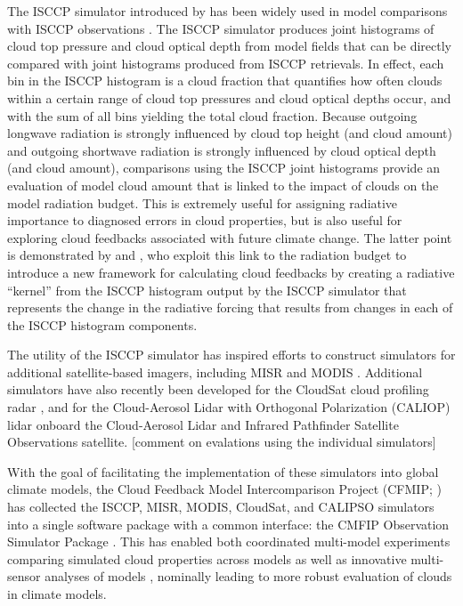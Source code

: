 The ISCCP simulator introduced by \citet{klein_and_jakob_1999} has been
widely used in model comparisons with ISCCP observations
\citep{webb_et_al_2001, norris_and_weaver_2001, lin_and_zhang_2004, zhang_et_al_2005, wyant_et_al_2006, klein_et_al_2013}.
The ISCCP simulator produces joint histograms of cloud top pressure and
cloud optical depth from model fields that can be directly compared with
joint histograms produced from ISCCP retrievals. In effect, each bin in
the ISCCP histogram is a cloud fraction that quantifies how often clouds
within a certain range of cloud top pressures and cloud optical depths
occur, and with the sum of all bins yielding the total cloud fraction.
Because outgoing longwave radiation is strongly influenced by cloud top
height (and cloud amount) and outgoing shortwave radiation is strongly
influenced by cloud optical depth (and cloud amount), comparisons using
the ISCCP joint histograms provide an evaluation of model cloud amount
that is linked to the impact of clouds on the model radiation budget.
This is extremely useful for assigning radiative importance to diagnosed
errors in cloud properties, but is also useful for exploring cloud
feedbacks associated with future climate change. The latter point is
demonstrated by \citet{zelinka_et_al_2012a} and
\citet{zelinka_et_al_2012b}, who exploit this link to the radiation
budget to introduce a new framework for calculating cloud feedbacks by
creating a radiative ``kernel'' from the ISCCP histogram output by the
ISCCP simulator that represents the change in the radiative forcing that
results from changes in each of the ISCCP histogram components.

The utility of the ISCCP simulator has inspired efforts to construct
simulators for additional satellite-based imagers, including MISR
\citep{marchand_and_ackerman_2010} and MODIS \citep{pincus_et_al_2012}.
Additional simulators have also recently been developed for the CloudSat
\citep{stephens_et_al_2002} cloud profiling radar
\citep[Quickbeam;][]{haynes_et_al_2007}, and for the Cloud-Aerosol Lidar
with Orthogonal Polarization (CALIOP) lidar \citep{chepfer_et_al_2008}
onboard the Cloud-Aerosol Lidar and Infrared Pathfinder Satellite
Observations \citep[CALIPSO][]{winker_et_al_2007} satellite. {[}comment
on evalations using the individual simulators{]}

With the goal of facilitating the implementation of these simulators
into global climate models, the Cloud Feedback Model Intercomparison
Project (CFMIP; \citep{webb_et_al_2016}) has collected the ISCCP, MISR,
MODIS, CloudSat, and CALIPSO simulators into a single software package
with a common interface: the CMFIP Observation Simulator Package
\citep[COSP;][]{bodas-salcedo_et_al_2011}. This has enabled both
coordinated multi-model experiments comparing simulated cloud properties
across models as well as innovative multi-sensor analyses of models
\citep[e.g.,][]{bodas-salcedo_et_al_2011, kay_et_al_2012, klein_et_al_2013},
nominally leading to more robust evaluation of clouds in climate models.

